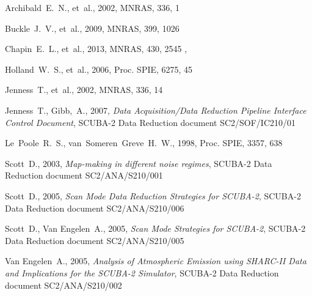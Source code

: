 \documentclass[oneside,11pt]{starlink}
\begin{document}


\begin{thebibliography}{}

Archibald~E.~N., et~al., 2002, MNRAS, 336, 1

Buckle~J.~V., et~al., 2009, MNRAS, 399, 1026

Chapin~E.~L., et~al., 2013, MNRAS, 430, 2545
,





Holland~W.~S., et~al., 2006, Proc. SPIE, 6275, 45

Jenness~T., et~al., 2002, MNRAS, 336, 14

Jenness~T., Gibb,~A., 2007, \textit{Data Acquisition/Data Reduction
  Pipeline Interface Control Document}, SCUBA-2 Data Reduction
document SC2/SOF/IC210/01

Le~Poole~R.~S., van~Someren~Greve~H.~W., 1998, Proc. SPIE, 3357, 638

Scott~D., 2003, {\it Map-making in different noise regimes}, SCUBA-2
  Data Reduction document SC2/ANA/S210/001

Scott~D., 2005, {\it Scan Mode Data Reduction Strategies for
  SCUBA-2}, SCUBA-2 Data Reduction document SC2/ANA/S210/006

Scott~D., Van Engelen~A., 2005, {\it Scan Mode Strategies for
  SCUBA-2}, SCUBA-2 Data Reduction document SC2/ANA/S210/005

Van Engelen~A., 2005, {\it Analysis of Atmospheric Emission using
  SHARC-II Data and Implications for the SCUBA-2 Simulator},
  SCUBA-2 Data Reduction document SC2/ANA/S210/002


\end{thebibliography}
\end{document}
